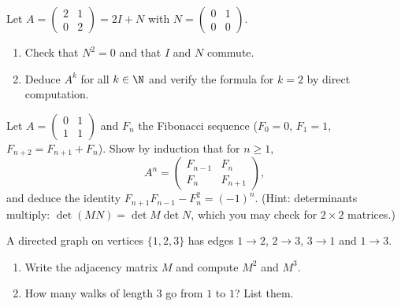 \begin{exercise}[$\star\star$]\label{exo:tle:matrix:4}
Let $A = \begin{pmatrix} 2 & 1\\ 0 & 2\end{pmatrix} = 2I + N$ with
$N = \begin{pmatrix} 0 & 1\\ 0 & 0 \end{pmatrix}$.
\begin{enumerate}
  \item Check that $N^2 = 0$ and that $I$ and $N$ commute.
  \item Deduce $A^k$ for all $k \in \N$ and verify the formula for $k=2$ by
        direct computation.
\end{enumerate}
\end{exercise}

\begin{exercise}[$\star\star$]\label{exo:tle:matrix:5}
Let $A = \begin{pmatrix} 0 & 1\\ 1 & 1\end{pmatrix}$ and $F_n$ the Fibonacci
sequence ($F_0 = 0$, $F_1 = 1$, $F_{n+2} = F_{n+1} + F_n$). Show by
induction that for $n \geq 1$,
\[
A^n = \begin{pmatrix} F_{n-1} & F_n\\ F_n & F_{n+1}\end{pmatrix},
\]
and deduce the identity $F_{n+1}F_{n-1} - F_n^2 = (-1)^n$.
(Hint: determinants multiply: $\det(MN) = \det M \det N$, which you may
check for $2\times2$ matrices.)
\end{exercise}

\begin{exercise}[$\star\star$]\label{exo:tle:matrix:6}
A directed graph on vertices $\{1, 2, 3\}$ has edges
$1\to2$, $2\to3$, $3\to1$ and $1\to3$.
\begin{enumerate}
  \item Write the adjacency matrix $M$ and compute $M^2$ and $M^3$.
  \item How many walks of length $3$ go from $1$ to $1$? List them.
\end{enumerate}
\end{exercise}

